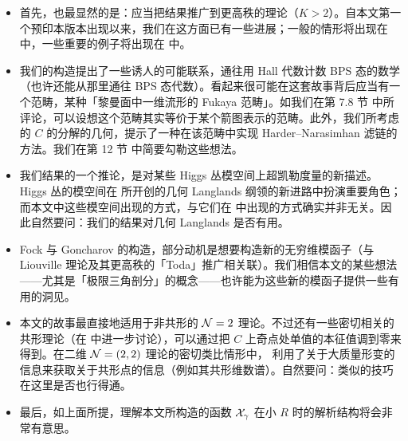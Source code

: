 \begin{itemize}

\item 首先，也最显然的是：应当把结果推广到更高秩的理论（$K>2$）。自本文第一个预印本版本出现以来，我们在这方面已有一些进展；一般的情形将出现在 \cite{gmn5-to-appear} 中，一些重要的例子将出现在 \cite{gmn6-to-appear} 中。

\item 我们的构造提出了一些诱人的可能联系，通往用 Hall 代数计数 BPS 态的数学（也许还能从那里通往 BPS 态代数）。看起来很可能在这套故事背后应当有一个范畴，某种「黎曼面中一维流形的 Fukaya 范畴」。如我们在第 7.8 节%
中所评论，可以设想这个范畴其实等价于某个箭图表示的范畴。此外，我们所考虑的 $C$ 的分解的几何，提示了一种在该范畴中实现 Harder–Narasimhan 滤链的方法。我们在第 12 节%
中简要勾勒这些想法。

\item 我们结果的一个推论，是对某些 Higgs 丛模空间上超凯勒度量的新描述。Higgs 丛的模空间在 \cite{geom-lang-n4} 所开创的几何 Langlands 纲领的新进路中扮演重要角色；而本文中这些模空间出现的方式，与它们在 \cite{geom-lang-n4} 中出现的方式确实并非无关。因此自然要问：我们的结果对几何 Langlands 是否有用。

\item Fock 与 Goncharov 的构造，部分动机是想要构造新的无穷维模函子（与 Liouville 理论及其更高秩的「Toda」推广相关联）。我们相信本文的某些想法——尤其是「极限三角剖分」的概念——也许能为这些新的模函子提供一些有用的洞见。

\item 本文的故事最直接地适用于非共形的 $\mathcal{N}=2$ 理论。不过还有一些密切相关的共形理论（在 \cite{Gaiotto:2009we} 中进一步讨论），可以通过把 $C$ 上奇点处单值的本征值调到零来得到。在二维 $\mathcal{N}=(2,2)$ 理论的密切类比情形中，\cite{Cecotti:1993rm} 利用了关于大质量形变的信息来获取关于共形点的信息（例如其共形维数谱）。自然要问：类似的技巧在这里是否也行得通。

\item 最后，如上面所提，理解本文所构造的函数 $\mathcal{X}_\gamma$ 在小 $R$ 时的解析结构将会非常有意思。

\end{itemize}
